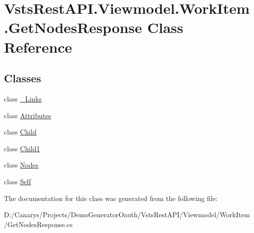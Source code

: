 \hypertarget{class_vsts_rest_a_p_i_1_1_viewmodel_1_1_work_item_1_1_get_nodes_response}{}\section{Vsts\+Rest\+A\+P\+I.\+Viewmodel.\+Work\+Item.\+Get\+Nodes\+Response Class Reference}
\label{class_vsts_rest_a_p_i_1_1_viewmodel_1_1_work_item_1_1_get_nodes_response}
\subsection*{Classes}
\begin{DoxyCompactItemize}
\item 
class \mbox{\hyperlink{class_vsts_rest_a_p_i_1_1_viewmodel_1_1_work_item_1_1_get_nodes_response_1_1___links}{\+\_\+\+Links}}
\item 
class \mbox{\hyperlink{class_vsts_rest_a_p_i_1_1_viewmodel_1_1_work_item_1_1_get_nodes_response_1_1_attributes}{Attributes}}
\item 
class \mbox{\hyperlink{class_vsts_rest_a_p_i_1_1_viewmodel_1_1_work_item_1_1_get_nodes_response_1_1_child}{Child}}
\item 
class \mbox{\hyperlink{class_vsts_rest_a_p_i_1_1_viewmodel_1_1_work_item_1_1_get_nodes_response_1_1_child1}{Child1}}
\item 
class \mbox{\hyperlink{class_vsts_rest_a_p_i_1_1_viewmodel_1_1_work_item_1_1_get_nodes_response_1_1_nodes}{Nodes}}
\item 
class \mbox{\hyperlink{class_vsts_rest_a_p_i_1_1_viewmodel_1_1_work_item_1_1_get_nodes_response_1_1_self}{Self}}
\end{DoxyCompactItemize}


The documentation for this class was generated from the following file\+:\begin{DoxyCompactItemize}
\item 
D\+:/\+Canarys/\+Projects/\+Demo\+Generator\+Oauth/\+Vsts\+Rest\+A\+P\+I/\+Viewmodel/\+Work\+Item/Get\+Nodes\+Response.\+cs\end{DoxyCompactItemize}

